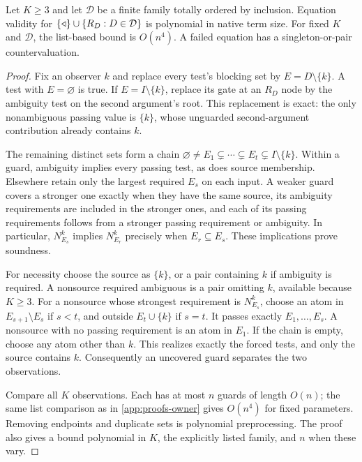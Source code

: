 \begin{theorem}\label{selective:thm:nested}
Let $K\geq3$ and let $\mathcal D$ be a finite family totally ordered by
inclusion. Equation validity for
$\{\mathbin{\triangleleft}\}\cup\{R_D:D\in\mathcal D\}$ is polynomial in native term size.
For fixed $K$ and $\mathcal D$, the list-based bound is $O(n^4)$.
A failed equation has a singleton-or-pair countervaluation.
\end{theorem}
\begin{proof}
Fix an observer $k$ and replace every test's blocking set by
$E=D\setminus\{k\}$. A test with $E=\varnothing$ is true.
If $E=I\setminus\{k\}$, replace its gate at an $R_D$ node by the
ambiguity test on the second argument's root. This replacement is exact:
the only nonambiguous passing value is $\{k\}$, whose unguarded
second-argument contribution already contains $k$.

The remaining distinct sets form a chain
$\varnothing\ne E_1\subsetneq\cdots\subsetneq E_t
\subsetneq I\setminus\{k\}$.
Within a guard, ambiguity implies every passing test, as does source
membership. Elsewhere retain only the largest required $E_s$ on each
input. A weaker guard covers a stronger one exactly when they have the
same source, its ambiguity requirements are included in the stronger
ones, and each of its passing requirements follows from a stronger
passing requirement or ambiguity. In particular,
$N_{E_s}^k$ implies $N_{E_r}^k$ precisely when $E_r\subseteq E_s$.
These implications prove soundness.

For necessity choose the source as $\{k\}$, or a pair containing $k$
if ambiguity is required. A nonsource required ambiguous is a pair
omitting $k$, available because $K\geq3$. For a nonsource whose
strongest requirement is $N_{E_s}^k$, choose an atom in
$E_{s+1}\setminus E_s$ if $s<t$, and outside $E_t\cup\{k\}$ if
$s=t$. It passes exactly $E_1,\ldots,E_s$. A nonsource with no
passing requirement is an atom in $E_1$. If the chain is empty,
choose any atom other than $k$. This realizes exactly the forced
tests, and only the source contains $k$. Consequently an uncovered
guard separates the two observations.

Compare all $K$ observations. Each has at most $n$ guards of length
$O(n)$; the same list comparison as in \cref{app:proofs-owner} gives
$O(n^4)$ for fixed parameters. Removing endpoints and duplicate sets
is polynomial preprocessing. The proof also gives a bound polynomial
in $K$, the explicitly listed family, and $n$ when these vary.
\end{proof}

